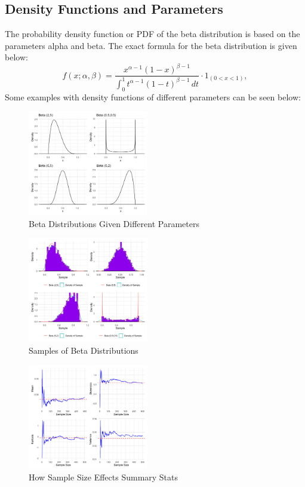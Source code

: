 \documentclass{article}\usepackage[]{graphicx}\usepackage[]{xcolor}
\begin{document}
\begin{multicols}{2}
\section{Density Functions and Parameters}
The probability density function or PDF of the beta distribution is based on the parameters alpha and beta. The exact formula for the beta distribution is given below:
\[
f(x; \alpha, \beta) = \frac{x^{\alpha-1}(1-x)^{\beta-1}}{\int_0^1 t^{\alpha-1}(1-t)^{\beta-1} \, dt} \cdot 1_{(0 < x < 1)},
\]
Some examples with density functions of different parameters can be seen below:
\begin{figure}[H]
\centering
\includegraphics[width=0.47\textwidth]{BDistributions.png}  %
\caption{Beta Distributions Given Different Parameters}
\label{Figure 1}
\end{figure}


\begin{figure}[H]
\centering
\includegraphics[width=0.47\textwidth]{SampDist}  %
\caption{Samples of Beta Distributions}
\label{Figure 2}
\end{figure}


\begin{figure}[H]
\centering
\includegraphics[width=0.47\textwidth]{SampStat}  %
\caption{How Sample Size Effects Summary Stats}
\label{Figure 3}
\end{figure}


\end{multicols}
\end{document}
